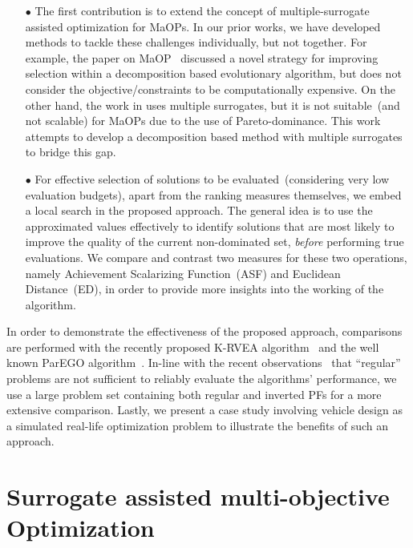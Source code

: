\documentclass[twocolumn,10pt]{asme2ej}
\begin{document}
\begin{itemize}

\item[$\bullet$] The first contribution is to extend the concept of multiple-surrogate assisted optimization for MaOPs. In our prior works, we have developed methods to tackle these challenges individually, but not together. For example, the paper on MaOP~\cite{KHTjmd2017} discussed a novel strategy for improving selection within a decomposition based evolutionary algorithm, but does not consider the objective/constraints to be computationally expensive. On the other hand, the work in \cite{KHTjmd2016,bhattacharjee2016multiple} uses multiple surrogates, {\color{blue}but it is not} suitable~(and not scalable) for MaOPs due to the use of Pareto-dominance. This work attempts to develop a decomposition based method with multiple surrogates to bridge this gap. 

\item[$\bullet$]  For effective selection of solutions to be evaluated~(considering very low evaluation budgets), apart from the ranking measures themselves, we embed a local search in the proposed approach. {\color{blue}The general idea is to use the approximated values effectively to identify solutions that are most likely to improve the quality of the current non-dominated set, \emph{before} performing true evaluations.} We compare and contrast two measures for these two operations, namely Achievement Scalarizing Function~(ASF) and Euclidean Distance~(ED), in order to provide more insights into the working of the algorithm. 


\end{itemize}

{\color{blue}
In order to demonstrate the effectiveness of the proposed approach, comparisons are performed with the recently proposed K-RVEA algorithm~\cite{KHTchugh2016krvea,KHTchugh2016const} and the well known ParEGO algorithm~\cite{KHTknowles2006pha}. In-line with the recent observations~\cite{asaf2017enhanced,KHTishibuchi2016inverse} that ``regular'' problems are not sufficient to reliably evaluate the algorithms' performance, we use a large problem set containing both regular and inverted PFs for a more extensive comparison. Lastly, we present a case study involving {\color{blue}vehicle design} as a simulated real-life optimization problem to illustrate the benefits of such an approach. 
}


\section{Surrogate assisted multi-objective Optimization}
\label{sec:KHTsec:3}
\end{document}
